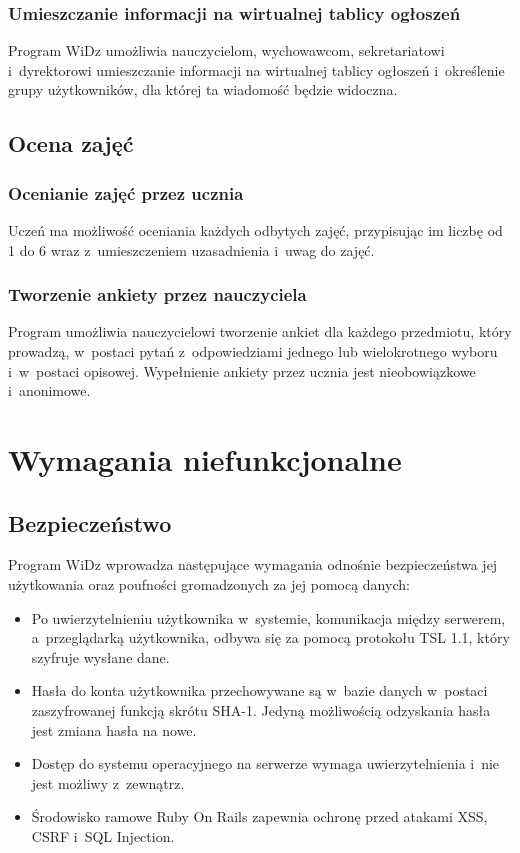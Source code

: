 \documentclass[12pt,leqno,twoside]{mwart}
\begin{document}
\subsubsection{Umieszczanie informacji na wirtualnej tablicy ogłoszeń}
\noindent Program WiDz umożliwia nauczycielom, wychowawcom, sekretariatowi i~dyrektorowi umieszczanie informacji na wirtualnej tablicy ogłoszeń i~określenie grupy użytkowników, dla której ta wiadomość będzie widoczna.

\subsection{Ocena zajęć}
\subsubsection{Ocenianie zajęć przez ucznia}
\noindent Uczeń ma możliwość oceniania każdych odbytych zajęć, przypisując im liczbę od 1 do 6 wraz z~umieszczeniem uzasadnienia i~uwag do zajęć.

\subsubsection{Tworzenie ankiety przez nauczyciela}
\noindent Program umożliwia nauczycielowi tworzenie ankiet dla każdego przedmiotu, który prowadzą, w~postaci pytań z~odpowiedziami jednego lub wielokrotnego wyboru i~w~postaci opisowej. Wypełnienie ankiety przez ucznia jest nieobowiązkowe i~anonimowe.

\section{Wymagania niefunkcjonalne}
\subsection{Bezpieczeństwo}
\noindent Program WiDz wprowadza następujące wymagania odnośnie bezpieczeństwa jej użytkowania oraz poufności gromadzonych za jej pomocą danych:
\begin{itemize}
	\item Po uwierzytelnieniu użytkownika w~systemie, komunikacja między serwerem, a~przeglądarką użytkownika, odbywa się za pomocą protokołu TSL 1.1, który szyfruje wysłane dane.
	\item Hasła do konta użytkownika przechowywane są w~bazie danych w~postaci zaszyfrowanej funkcją skrótu SHA-1. Jedyną możliwością odzyskania hasła jest zmiana hasła na nowe.
	\item Dostęp do systemu operacyjnego na serwerze wymaga uwierzytelnienia i~nie jest możliwy z~zewnątrz.
	\item Środowisko ramowe Ruby On Rails zapewnia ochronę przed atakami XSS, CSRF i~SQL Injection.
\end{itemize}
\end{document}
